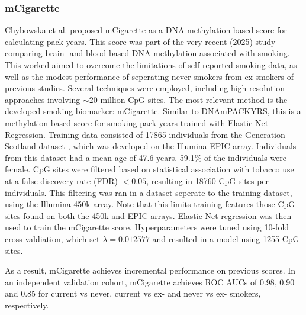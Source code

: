 \documentclass{article}
\begin{document}

\subsubsection{mCigarette} \label{sec:mcigarette}
Chybowska et al. \cite{chybowska2025blood} proposed mCigarette as a DNA methylation based score for calculating pack-years. This score was part of the very recent (2025) study comparing brain- and blood-based DNA methylation associated with smoking. This worked aimed to overcome the limitations of self-reported smoking data, as well as the modest performance of seperating never smokers from ex-smokers of previous studies. Several techniques were employed, including high resolution approaches involving \(\sim \! 20\) million CpG sites. The most relevant method is the developed smoking biomarker: mCigarette. Similar to DNAmPACKYRS, this is a methylation based score for smoking pack-years trained with Elastic Net Regression. Training data consisted of \num{17865} individuals from the Generation Scotland dataset \cite{smith2006generation}, which was developed on the Illumina EPIC array. Individuals from this dataset had a mean age of 47.6 years. 59.1\% of the individuals were female. CpG sites were filtered based on statistical association with tobacco use at a false discovery rate (FDR) \(< 0.05\), resulting in \num{18760} CpG sites per individuals. This filtering was ran in a dataset seperate to the training dataset, using the Illumina 450k array. Note that this limits training features those CpG sites found on both the 450k and EPIC arrays. Elastic Net regression was then used to train the mCigarette score. Hyperparameters were tuned using 10-fold cross-valdiation, which set \(\lambda = 0.012577\) and resulted in a model using \num{1255} CpG sites.

As a result, mCigarette achieves incremental performance on previous scores. In an independent validation cohort, mCigarette achieves ROC AUCs of 0.98, 0.90 and 0.85 for current vs never, current vs ex- and never vs ex- smokers, respectively.

\end{document}
